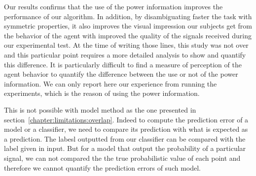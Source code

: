 Our results confirms that the use of the power information improves the performance of our algorithm. In addition, by disambiguating faster the task with symmetric properties, it also improves the visual impression our subjects get from the behavior of the agent with improved the quality of the signals received during our experimental test. At the time of writing those lines, this study was not over and this particular point requires a more detailed analysis to show and quantify this difference. It is particularly difficult to find a measure of perception of the agent behavior to quantify the difference between the use or not of the power information. We can only report here our experience from running the experiments, which is the reason of using the power information.


This is not possible with model method as the one presented in section~\ref{chapter:limitations:overlap}. Indeed to compute the prediction error of a model or a classifier, we need to compare its prediction with what is expected as a prediction. The labesl outputted from our classifier can be compared with the label given in input. But for a model that output the probability of a particular signal, we can not compared the the true probabilistic value of each point and therefore we cannot quantify the prediction errors of such model.



